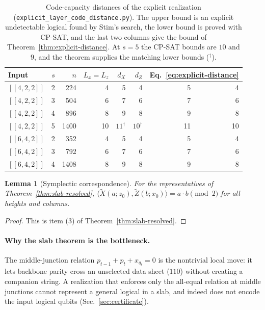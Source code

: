 \documentclass[aps,prx,reprint,superscriptaddress,nofootinbib,floatfix,longbibliography]{revtex4-2}
\newtheorem{lemma}[theorem]{Lemma}
\theoremstyle{definition}
\begin{document}
\begin{table}[t]
\caption{Code-capacity distances of the explicit realization
(\texttt{explicit\_layer\_code\_distance.py}).  The upper bound is an explicit
undetectable logical found by Stim's search, the lower bound is proved with
CP-SAT, and the last two columns give the bound of
Theorem~\ref{thm:explicit-distance}.  At $s=5$ the CP-SAT bounds are $10$ and
$9$, and the theorem supplies the matching lower bounds ($^\dagger$).}
\label{tab:explicit-distance}
\centering
\small
\begin{tabular}{@{}lrrrrrrr@{}}
\toprule
Input & $s$ & $n$ & $L_x=L_z$ & $d_X$ & $d_Z$ & \multicolumn{2}{c}{Eq.~\eqref{eq:explicit-distance}} \\
\midrule
$[[4,2,2]]$ & 2 & 224 & 4 & 5 & 4 & 5 & 4 \\
$[[4,2,2]]$ & 3 & 504 & 6 & 7 & 6 & 7 & 6 \\
$[[4,2,2]]$ & 4 & 896 & 8 & 9 & 8 & 9 & 8 \\
$[[4,2,2]]$ & 5 & 1400 & 10 & $11^\dagger$ & $10^\dagger$ & 11 & 10 \\
$[[6,4,2]]$ & 2 & 352 & 4 & 5 & 4 & 5 & 4 \\
$[[6,4,2]]$ & 3 & 792 & 6 & 7 & 6 & 7 & 6 \\
$[[6,4,2]]$ & 4 & 1408 & 8 & 9 & 8 & 9 & 8 \\
\bottomrule
\end{tabular}
\end{table}

\begin{lemma}[Symplectic correspondence]
\label{lem:slab-symplectic-resolved}
For the representatives of Theorem~\ref{thm:slab-resolved},
$\langle\widetilde X(a;z_0),\widetilde Z(b;x_0)\rangle=a\cdot b\pmod 2$ for
all heights and columns.
\end{lemma}
\begin{proof}
This is item (3) of Theorem~\ref{thm:slab-resolved}.
\end{proof}

\paragraph{Why the slab theorem is the bottleneck.}
The middle-junction relation $p_{t-1}+p_t+x_{q_t}=0$ is the nontrivial local
move: it lets backbone parity cross an unselected data sheet ($110$) without
creating a companion string.  A realization that enforces only the
all-equal relation at middle junctions cannot represent a general logical in
a slab, and indeed does not encode the input logical qubits
(Sec.~\ref{sec:certificate}).
\end{document}
